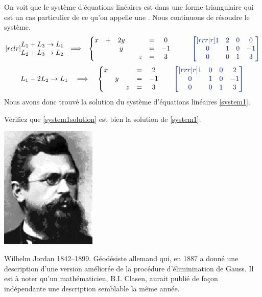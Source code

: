 On voit que le système d'équations linéaires est dans une forme triangulaire
qui est un cas particulier de ce qu'on appelle une .
	Nous continuons de résoudre le système.
\[
	\begin{matrix}[rclr]
		\begin{matrix}
		L_1 + L_3 \rightarrow L_1\\
		L_2 + L_3 \rightarrow L_2\\
		\end{matrix}
	&\Longrightarrow&
		\left\{
		\begin{matrix}
		x &+& 2y && &=& 0\\
		 && y && &=& -1\\
		 &&  && z &=& 3
		\end{matrix}
		\right.&
			\qquad\color{ExerciceCouleur}
	    \begin{bmatrix}[rrr|r]
        1 & 2 & 0 & 0 \\
        0 & 1 & 0 & -1 \\
        0 & 0 & 1 & 3
        \end{bmatrix}	
	\end{matrix}
	\]
\begin{equation}
	\label{system1solution}
	L_1 -2 L_2 \rightarrow L_1
	\quad\Longrightarrow \quad
	\left\{
	\begin{matrix}
	x & && =& 2\\
	 & y &&=& -1\\
	  && z &=& 3
	\end{matrix}
			\qquad\color{ExerciceCouleur}
	    \begin{bmatrix}[rrr|r]
        1 & 0 & 0 & 2 \\
        0 & 1 & 0 & -1 \\
        0 & 0 & 1 & 3
        \end{bmatrix}
	\right.
\end{equation}
Nous avons donc trouvé la solution du système d'équations linéaires \eqref{system1}.

\begin{exerciceB}
 Vérifiez que \eqref{system1solution} est bien la solution de \eqref{system1}.
\end{exerciceB}
 	 \begin{marginfigure}
 	 \includegraphics[width=1.8in]{images/jordan.png}
 	 \caption{Wilhelm Jordan 1842--1899. Géodésiste allemand qui, en 1887 a donné une
 	 description d'une version améliorée de la procédure d'éliminination de Gauss. Il est
 	 à noter qu'un mathématicien, B.I. Clasen, aurait publié de façon indépendante
 	 une description semblable la même année.}\label{image:jordan}
 	 \end{marginfigure}
 
